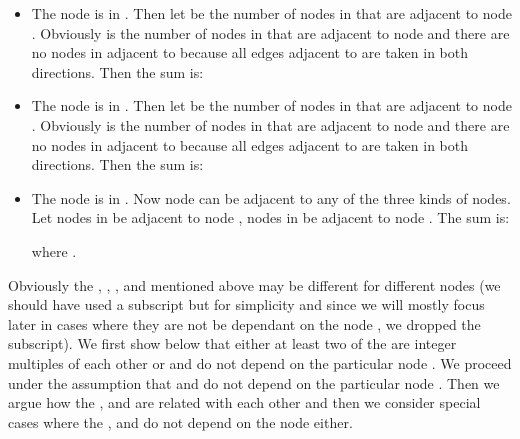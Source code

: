\begin{itemize}
\item The node  is in . Then let  be the number of nodes in  that are adjacent to node . Obviously  is the number of nodes in  that are adjacent to node  and there are no nodes in  adjacent to  because all edges adjacent to  are taken in both directions. Then the sum is: 

\item The node  is in . Then let  be the number of nodes in  that are adjacent to node . Obviously  is the number of nodes in  that are adjacent to node  and there are no nodes in  adjacent to  because all edges adjacent to  are taken in both directions. Then the sum is: 


\item The node  is in . Now node  can be adjacent to any of the three kinds of nodes. Let   nodes in  be adjacent to node ,  nodes in  be adjacent to node . The sum is:
    
    where .
\end{itemize}

Obviously the , , ,  and  mentioned above may be
different for different nodes  (we should have used a subscript  but
for simplicity and since we will mostly focus later in cases
where they are not be dependant on the node
, we dropped the subscript). We first show below that either at least two of
the  are integer
multiples of each other or  and  do not
depend on the particular node .
We proceed under the assumption that   and  do not
depend on the particular node .
Then we argue how the ,  and 
are related with each other and then we consider special cases where
the ,  and  do not depend on the node  either.

